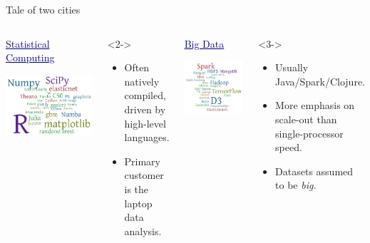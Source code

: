 \documentclass[aspectratio=169]{beamer}
\begin{document}
\begin{frame}{Tale of two cities}
\vspace{0.2 cm}
\begin{columns}
\begin{center}
\textcolor{darkblue}{\Large \underline{Statistical Computing}}

\vspace{0.25 cm}
\includegraphics[height=3.5 cm]{statistical-software.png}
\end{center}

\vspace{-0.35 cm}
\begin{uncoverenv}<2->
\begin{itemize}
\item Often natively compiled, driven by high-level languages.
\item Primary customer is the laptop data analysis.
\end{itemize}
\end{uncoverenv}

\begin{center}
\textcolor{darkblue}{\Large \underline{Big Data}}

\vspace{0.25 cm}
\includegraphics[height=3.5 cm]{bigdata-software.png}
\end{center}

\vspace{-0.35 cm}
\begin{uncoverenv}<3->
\begin{itemize}
\item Usually Java/Spark/Clojure.
\item More emphasis on scale-out than single-processor speed.
\item Datasets assumed to be {\it big.}
\end{itemize}
\end{uncoverenv}

\end{columns}
\end{frame}
\end{document}
